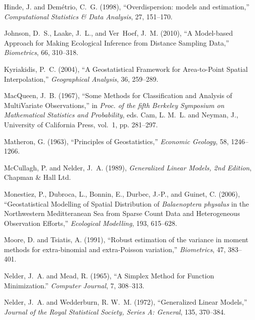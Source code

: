 \documentclass[12pt, titlepage]{article}\usepackage[]{graphicx}\usepackage[]{color}
\begin{document}
\begin{thebibliography}{47}
Hinde, J. and Dem{\'e}trio, C.~G. (1998), \enquote{Overdispersion: models and
  estimation,} \textit{Computational Statistics \& Data Analysis}, 27,
  151--170.

Johnson, D.~S., Laake, J.~L., and Ver~Hoef, J.~M. (2010), \enquote{A
  Model-based Approach for Making Ecological Inference from Distance Sampling
  Data,} \textit{Biometrics}, 66, 310--318.

Kyriakidis, P.~C. (2004), \enquote{A Geostatistical Framework for Area-to-Point
  Spatial Interpolation,} \textit{Geographical Analysis}, 36, 259--289.

MacQueen, J.~B. (1967), \enquote{Some Methods for Classification and Analysis
  of MultiVariate Observations,} in \textit{Proc. of the fifth Berkeley
  Symposium on Mathematical Statistics and Probability}, eds. Cam, L. M.~L. and
  Neyman, J., University of California Press, vol.~1, pp. 281--297.

Matheron, G. (1963), \enquote{Principles of Geostatistics,} \textit{Economic
  Geology}, 58, 1246--1266.

McCullagh, P. and Nelder, J.~A. (1989), \textit{Generalized Linear Models, 2nd
  Edition}, Chapman \& Hall Ltd.

Monestiez, P., Dubroca, L., Bonnin, E., Durbec, J.-P., and Guinet, C. (2006),
  \enquote{Geostatistical Modelling of Spatial Distribution of {\it
  Balaenoptera physalus} in the Northwestern Meditteranean Sea from Sparse
  Count Data and Heterogeneous Observation Efforts,} \textit{Ecological
  Modelling}, 193, 615--628.

Moore, D. and Tsiatis, A. (1991), \enquote{Robust estimation of the variance in
  moment methods for extra-binomial and extra-Poisson variation,}
  \textit{Biometrics}, 47, 383--401.

Nelder, J.~A. and Mead, R. (1965), \enquote{A Simplex Method for Function
  Minimization.} \textit{Computer Journal}, 7, 308--313.

Nelder, J.~A. and Wedderburn, R. W.~M. (1972), \enquote{Generalized Linear
  Models,} \textit{Journal of the Royal Statistical Society, Series A:
  General}, 135, 370--384.


\end{thebibliography}
\end{document}
